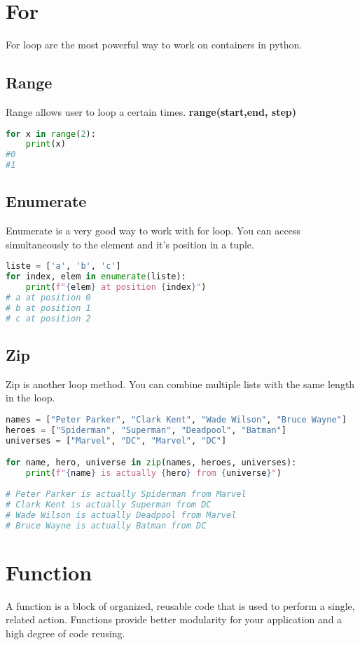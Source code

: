 \documentclass[a4paper, 12pt]{article}
\begin{document}
\newpage
\section{For}
\label{subsec:For}
For loop are the most powerful way to work on containers in python.

\subsection{Range}
Range allows user to loop a certain times. \textbf{range(start,end, step)}
\begin{lstlisting}[language=Python]
for x in range(2):
	print(x)
#0
#1
\end{lstlisting}

\subsection{Enumerate}
Enumerate is a very good way to work with for loop. You can access simultaneously to the element and it's position in a tuple.
\begin{lstlisting}[language=Python]
liste = ['a', 'b', 'c']
for index, elem in enumerate(liste):
	print(f"{elem} at position {index}")
# a at position 0
# b at position 1
# c at position 2
\end{lstlisting}

\subsection{Zip}
Zip is another loop method. You can combine multiple lists with the same length in the loop. 
\begin{lstlisting}[language=Python]
names = ["Peter Parker", "Clark Kent", "Wade Wilson", "Bruce Wayne"]
heroes = ["Spiderman", "Superman", "Deadpool", "Batman"]
universes = ["Marvel", "DC", "Marvel", "DC"]

for name, hero, universe in zip(names, heroes, universes):
	print(f"{name} is actually {hero} from {universe}")
	
# Peter Parker is actually Spiderman from Marvel
# Clark Kent is actually Superman from DC
# Wade Wilson is actually Deadpool from Marvel
# Bruce Wayne is actually Batman from DC
\end{lstlisting}

\newpage
\section{Function}
\label{sec:Function}
A function is a block of organized, reusable code that is used to perform a single, related action. Functions provide better modularity for your application and a high degree of code reusing.\newline
\end{document}
